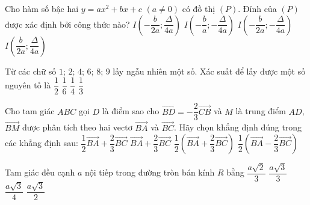 \documentclass[12pt,a4paper,openany,oneside]{book}
\begin{document}
\begin{ex}%
	Cho hàm số bậc hai $y=ax^2+bx+c$ $(a \neq 0)$ có đồ thị $(P)$. Đỉnh  của $(P)$ được xác định bởi công thức nào?
	 \choice
		 {$I\left(-\dfrac{b}{2a};\dfrac{\Delta}{4a}\right)$}
		{$I\left(-\dfrac{b}{a};-\dfrac{\Delta}{4a}\right)$} 
		{\True  $I\left(-\dfrac{b}{2a};-\dfrac{\Delta}{4a}\right)$}
		{$I\left(\dfrac{b}{2a};\dfrac{\Delta}{4a}\right)$} 
\end{ex}

\begin{ex}%
	Từ các chữ số $1$; $2$; $4$; $6$; $8$; $9$  lấy ngẫu nhiên một số. Xác suất để lấy được một số nguyên tố là
	\choice 
		{$\dfrac{1}{2}$} 
		{\True $\dfrac{1}{6}$} 
		{$\dfrac{1}{4}$} 
		 {$\dfrac{1}{3}$}
\end{ex}

\begin{ex}%
	Cho tam giác $ABC$ gọi $D$ là điểm sao cho $\overrightarrow{BD}=-\dfrac{2}{3}\overrightarrow{CB}$ và $M$ là trung điểm  $AD$, $\overrightarrow{BM}$ được phân tích theo hai vectơ $\overrightarrow{BA}$ và $\overrightarrow{BC}$. Hãy chọn khẳng định đúng trong các khẳng định sau:
	\choice 
		{$\dfrac{1}{2}\overrightarrow{BA}+\dfrac{2}{3}\overrightarrow{BC}$} 
		 {$\overrightarrow{BA}+\dfrac{2}{3}\overrightarrow{BC}$}
		{\True  $\dfrac{1}{2}\left(\overrightarrow{BA}+\dfrac{2}{3}\overrightarrow{BC}\right)$} 
		{$\dfrac{1}{2}\left(\overrightarrow{BA}-\dfrac{2}{3}\overrightarrow{BC}\right)$}
\end{ex}

\begin{ex}%
	Tam  giác đều cạnh $a$ nội tiếp trong đường tròn bán kính $R$ bằng
	 \choice
		{$\dfrac{a\sqrt 2}{3}$}
		{\True  $\dfrac{a\sqrt 3}{3}$}
		 {$\dfrac{a\sqrt  3}{4}$}
		{$\dfrac{a\sqrt  3}{2}$}
\end{ex}
\end{document}

